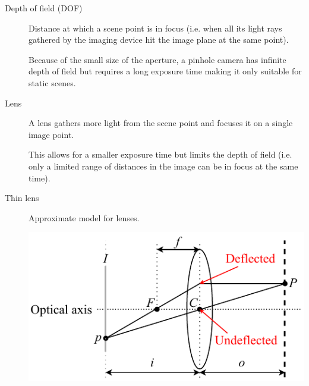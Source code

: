 \begin{description}
    \item[Depth of field (DOF)] 
        Distance at which a scene point is in focus (i.e. when all its light rays gathered by the imaging device hit the image plane at the same point).

        \begin{remark}
            Because of the small size of the aperture, a pinhole camera has infinite depth of field
            but requires a long exposure time making it only suitable for static scenes.
        \end{remark}


    \item[Lens] 
        A lens gathers more light from the scene point and focuses it on a single image point.

        This allows for a smaller exposure time but limits the depth of field (i.e. only a limited range of distances in the image can be in focus at the same time).


    \item[Thin lens] 
        Approximate model for lenses.

        \begin{minipage}{0.65\textwidth}
        \end{minipage}
        \begin{minipage}{0.4\textwidth}
            \centering
            \includegraphics[width=\textwidth]{./img/_thin_lens.pdf}
        \end{minipage}


\end{description}
